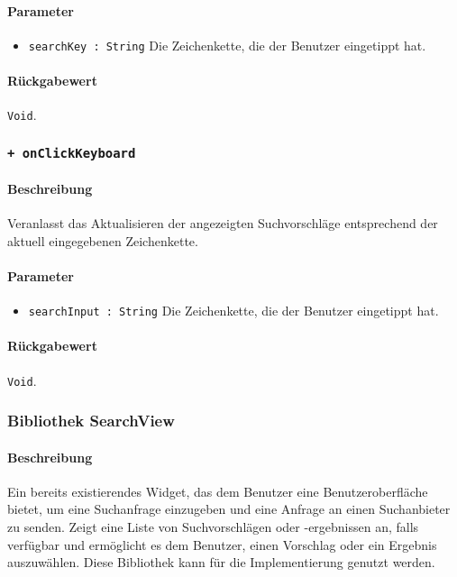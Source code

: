 \paragraph*{Parameter}
\begin{itemize}
    \item \texttt{searchKey : String} Die Zeichenkette, die der Benutzer eingetippt hat.
\end{itemize}
\paragraph*{Rückgabewert}
\texttt{Void}.

\subsubsection*{\texttt{+ onClickKeyboard}}%
\paragraph*{Beschreibung}
Veranlasst das Aktualisieren der angezeigten Suchvorschläge entsprechend der aktuell eingegebenen Zeichenkette.
\paragraph*{Parameter}
\begin{itemize}
    \item \texttt{searchInput : String} Die Zeichenkette, die der Benutzer eingetippt hat.
\end{itemize}
\paragraph*{Rückgabewert}
\texttt{Void}.


\subsubsection*{Bibliothek SearchView}
\paragraph*{Beschreibung}
Ein bereits existierendes Widget, das dem Benutzer eine Benutzeroberfläche bietet, um eine Suchanfrage einzugeben und eine Anfrage an einen Suchanbieter zu senden. 
Zeigt eine Liste von Suchvorschlägen oder -ergebnissen an, falls verfügbar 
und ermöglicht es dem Benutzer, einen Vorschlag oder ein Ergebnis auszuwählen.
Diese Bibliothek kann für die Implementierung genutzt werden.